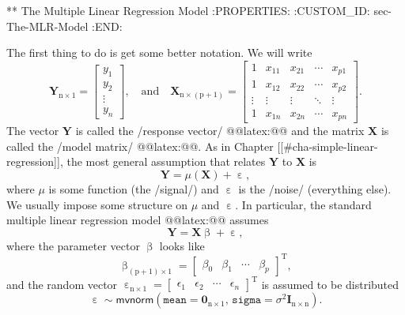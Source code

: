 ** The Multiple Linear Regression Model
:PROPERTIES:
:CUSTOM_ID: sec-The-MLR-Model
:END:

The first thing to do is get some better notation. We will write
\begin{equation}
\mathbf{Y}_{\mathrm{n}\times1}=
\begin{bmatrix}y_{1}\\
y_{2}\\
\vdots\\
y_{n}
\end{bmatrix},
\quad \mbox{and}\quad \mathbf{X}_{\mathrm{n}\times(\mathrm{p}+1)}=
\begin{bmatrix}1 & x_{11} & x_{21} & \cdots & x_{p1}\\
1 & x_{12} & x_{22} & \cdots & x_{p2}\\
\vdots & \vdots & \vdots & \ddots & \vdots\\
1 & x_{1n} & x_{2n} & \cdots & x_{pn}
\end{bmatrix}.
\end{equation}
The vector \(\mathbf{Y}\) is called the /response vector/
@@latex:@@ and the matrix \(\mathbf{X}\) is called the
/model matrix/ @@latex:@@. As in Chapter [[#cha-simple-linear-regression]], the most general assumption that relates \(\mathbf{Y}\) to
\(\mathbf{X}\) is
\begin{equation}
\mathbf{Y}=\mu(\mathbf{X})+\upepsilon,
\end{equation}
where \(\mu\) is some function (the /signal/) and \(\upepsilon\) is
the /noise/ (everything else). We usually impose some structure on
\(\mu\) and \(\upepsilon\). In particular, the standard multiple
linear regression model @@latex:@@
assumes
\begin{equation}
\mathbf{Y}=\mathbf{X}\upbeta+\upepsilon,
\end{equation}
where the parameter vector \(\upbeta\) looks like 
\begin{equation}
\upbeta_{(\mathrm{p}+1)\times1}=\begin{bmatrix}\beta_{0} & \beta_{1} & \cdots & \beta_{p}\end{bmatrix}^{\mathrm{T}},
\end{equation}
and the random vector
\(\upepsilon_{\mathrm{n}\times1}=\begin{bmatrix}\epsilon_{1} &
\epsilon_{2} & \cdots & \epsilon_{n}\end{bmatrix}^{\mathrm{T}}\) is
assumed to be distributed
\begin{equation}
\upepsilon\sim\mathsf{mvnorm}\left(\mathtt{mean}=\mathbf{0}_{\mathrm{n}\times1},\,\mathtt{sigma}=\sigma^{2}\mathbf{I}_{\mathrm{n}\times\mathrm{n}}\right).
\end{equation}

